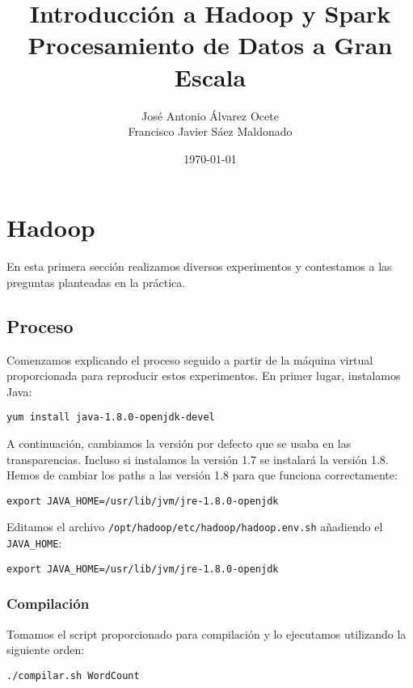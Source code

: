 \documentclass[11pt]{article}
\author{José Antonio Álvarez Ocete\\ Francisco Javier Sáez Maldonado}
\date{\today}
\title{Introducción a Hadoop y Spark\\\medskip
\large Procesamiento de Datos a Gran Escala}
\def\inline{\lstinline[basicstyle=\ttfamily,keywordstyle={}]}
\begin{document}
\maketitle

\tableofcontents

\section{Hadoop}

En esta primera sección realizamos diversos experimentos y contestamos a las preguntas planteadas en la práctica.

\subsection{Proceso}

Comenzamos explicando el proceso seguido a partir de la máquina virtual proporcionada para reproducir estos experimentos. En primer lugar, instalamos Java:

\begin{verbatim}
yum install java-1.8.0-openjdk-devel
\end{verbatim}

A continuación, cambiamos la versión por defecto que se usaba en las transparencias. Incluso si instalamos la versión 1.7 se instalará la versión 1.8. Hemos de cambiar los paths a las versión 1.8 para que funciona correctamente:

\begin{verbatim}
export JAVA_HOME=/usr/lib/jvm/jre-1.8.0-openjdk
\end{verbatim}

Editamos el archivo \inline{/opt/hadoop/etc/hadoop/hadoop.env.sh} añadiendo el \inline{JAVA_HOME}:

\begin{verbatim}
export JAVA_HOME=/usr/lib/jvm/jre-1.8.0-openjdk
\end{verbatim}

\subsubsection*{ Compilación}

Tomamos el script proporcionado para compilación y lo ejecutamos utilizando la siguiente orden:

\begin{verbatim}
./compilar.sh WordCount
\end{verbatim}
\end{document}

